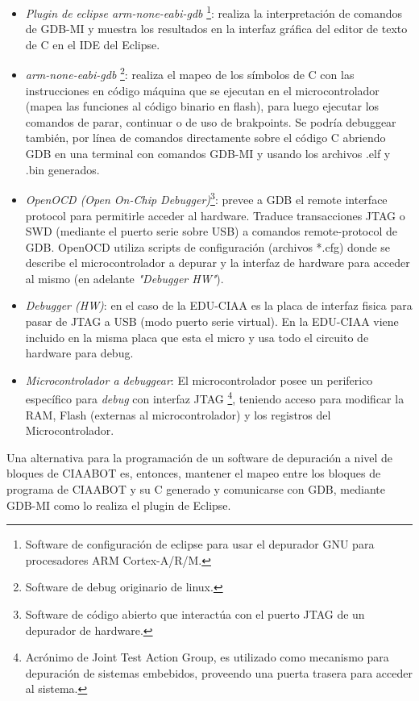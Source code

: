 \begin{itemize}
	\item \emph{Plugin de eclipse arm-none-eabi-gdb}
	\footnote{Software de configuración de eclipse para usar el depurador GNU para procesadores ARM Cortex-A/R/M.}: realiza la interpretación de comandos de	GDB-MI y muestra los resultados en la interfaz gráfica del editor de texto de C en el IDE del Eclipse.
	\item \emph{arm-none-eabi-gdb}
	\footnote{Software de debug originario de linux.}: realiza el mapeo de los símbolos de C con las instrucciones en código máquina que se ejecutan en el microcontrolador (mapea las funciones al código binario en flash), para
	luego ejecutar los comandos de parar, continuar o de uso de brakpoints. Se podría debuggear también, por línea de comandos directamente sobre el código C abriendo GDB en una terminal con comandos GDB-MI y usando los archivos .elf y .bin generados.
	\item \emph{OpenOCD (Open On-Chip Debugger)}\footnote{Software de código abierto que interactúa con el puerto JTAG de un depurador de hardware.}: prevee a GDB el remote interface protocol para permitirle acceder al hardware. Traduce transacciones JTAG o SWD (mediante el puerto serie sobre USB) a comandos remote-protocol de GDB. OpenOCD utiliza scripts de configuración (archivos *.cfg) donde se describe el microcontrolador a depurar y la interfaz de hardware para acceder al mismo (en adelante \emph{"Debugger HW"}).
	\item \emph{Debugger (HW)}: en el caso de la EDU-CIAA es la placa de interfaz fisica para pasar de JTAG a USB (modo puerto serie virtual). En la EDU-CIAA
	viene incluido en la misma placa que esta el micro y usa todo el circuito de hardware para debug.
	\item \emph{Microcontrolador a debuggear}: El microcontrolador posee un periferico específico para \emph{debug} con interfaz JTAG
	\footnote{Acrónimo de Joint Test Action Group, es utilizado como mecanismo para depuración de sistemas embebidos, proveendo una puerta trasera para acceder al sistema.}, teniendo acceso para modificar la RAM, Flash (externas al microcontrolador) y los registros del Microcontrolador.
\end{itemize}

Una alternativa para la programación de un software de depuración a nivel de bloques de CIAABOT es, entonces, mantener el mapeo entre los bloques de programa de CIAABOT y su C generado y comunicarse con GDB, mediante GDB-MI como lo realiza el plugin de Eclipse.

